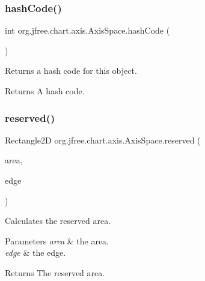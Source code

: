 \subsubsection{\texorpdfstring{hash\+Code()}{hashCode()}}
{\footnotesize\ttfamily int org.\+jfree.\+chart.\+axis.\+Axis\+Space.\+hash\+Code (\begin{DoxyParamCaption}{ }\end{DoxyParamCaption})}

Returns a hash code for this object.

\begin{DoxyReturn}{Returns}
A hash code. 
\end{DoxyReturn}
\mbox{\label{classorg_1_1jfree_1_1chart_1_1axis_1_1_axis_space_a5ede3cff673f833262e0726f1abe8cb9}} 
\subsubsection{\texorpdfstring{reserved()}{reserved()}}
{\footnotesize\ttfamily Rectangle2D org.\+jfree.\+chart.\+axis.\+Axis\+Space.\+reserved (\begin{DoxyParamCaption}\item[{Rectangle2D}]{area,  }\item[{Rectangle\+Edge}]{edge }\end{DoxyParamCaption})}

Calculates the reserved area.


\begin{DoxyParams}{Parameters}
{\em area} & the area. \\
\hline
{\em edge} & the edge.\\
\hline
\end{DoxyParams}
\begin{DoxyReturn}{Returns}
The reserved area. 
\end{DoxyReturn}
\mbox{\label{classorg_1_1jfree_1_1chart_1_1axis_1_1_axis_space_af85e8e906392b5fe7366236c1b564fd7}} 
